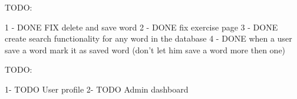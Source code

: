TODO:

1 - {DONE} FIX delete and save word
2 - {DONE} fix exercise page
3 - {DONE} create search functionality for any word in the database
4 - {DONE} when a user save a word mark it as saved word (don't let him save a word more then one)


TODO:

1- {TODO} User profile
2- {TODO} Admin dashboard
